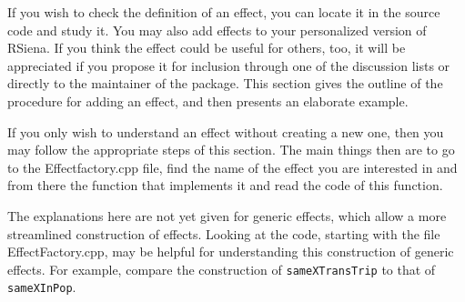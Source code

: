 \documentclass[a4paper,fleqn,11pt]{article}
\newcommand{\+}{\, + \,}
\newcommand{\sfn}[1]{\textsf{#1}}
\newcommand{\rs}{{\sf RSiena}}
\begin{document}
If you wish to check the definition of an effect,
you can locate it in the source code and study it.
You may also add
effects to your personalized version of \rs.
If you think the effect could be useful for others, too,
it will be appreciated if you propose it for inclusion through
one of the discussion lists or directly to the maintainer
of the package.
This section gives the outline of the procedure for adding an effect, and then presents
an elaborate example.

If you only wish to understand an effect without creating
a new one, then you may
follow the appropriate steps of this section.
The main things then are to go to the \textsf{Effectfactory.cpp}
file, find the name of the effect you are interested in and
from there the function that implements it
and read the code of this function.

The explanations here are not yet given for generic effects, which allow
a more streamlined construction of effects. Looking at the code,
starting with the file \sfn{EffectFactory.cpp}, may be helpful for understanding
this construction of generic effects.
For example, compare the construction of \texttt{sameXTransTrip} to that of
\texttt{sameXInPop}.
\end{document}
